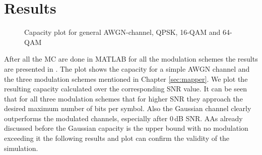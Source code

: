\section{Results}
\begin{figure}[!htb]
		\setlength{}
	\setlength\fheight{0.4\textheight}
	\centering
	
	\caption{Capacity plot for general AWGN-channel, QPSK, 16-QAM and 64-QAM}
	\label{fig:capmod}
\end{figure}
After all the \gls{MC} are done in MATLAB for all the modulation schemes the results are presented in . The plot shows the capacity for a simple AWGN channel and the three modulation schemes mentioned in Chapter \eqref{sec:mapper}. We plot the resulting capacity calculated over the corresponding SNR value. 
It can be seen that for all three modulation schemes that for higher \gls{SNR} they approach the desired maximum number of bits per symbol.
Also the Gaussian channel clearly outperforms the modulated channels, especially  after 0\,dB SNR. AAs already discussed before the Gaussian capacity is the upper bound with no modulation exceeding it the following results and plot can confirm the validity of the simulation.


\clearpage